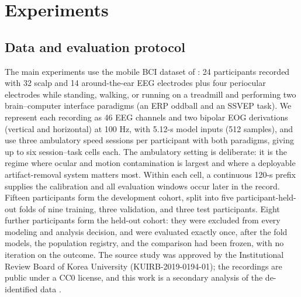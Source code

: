 \section{Experiments}
\label{sec:experiments}

\subsection{Data and evaluation protocol}
\label{sec:exp-data}

The main experiments use the mobile BCI dataset of \citet{lee2021mobile}: 24 participants recorded with 32 scalp and 14 around-the-ear EEG electrodes plus four periocular electrodes while standing, walking, or running on a treadmill and performing two brain--computer interface paradigms (an ERP oddball and an SSVEP task). We represent each recording as 46 EEG channels and two bipolar EOG derivations (vertical and horizontal) at 100 Hz, with 5.12-s model inputs (512 samples), and use three ambulatory speed sessions per participant with both paradigms, giving up to six session--task cells each. The ambulatory setting is deliberate: it is the regime where ocular and motion contamination is largest and where a deployable artifact-removal system matters most. Within each cell, a continuous 120-s prefix supplies the calibration and all evaluation windows occur later in the record. Fifteen participants form the development cohort, split into five participant-held-out folds of nine training, three validation, and three test participants. Eight further participants form the held-out cohort: they were excluded from every modeling and analysis decision, and were evaluated exactly once, after the fold models, the population registry, and the comparison had been frozen, with no iteration on the outcome. The source study was approved by the Institutional Review Board of Korea University (KUIRB-2019-0194-01); the recordings are public under a CC0 license, and this work is a secondary analysis of the de-identified data \cite{lee2021mobile}.

